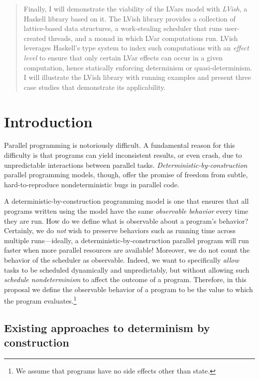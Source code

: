 \documentclass{article}
\begin{document}
\begin{abstract}
  Finally, I will demonstrate the viability of the LVars model with
  \emph{LVish}, a Haskell library based on it.  The LVish library
  provides a collection of lattice-based data structures, a
  work-stealing scheduler that runs user-created threads, and a monad
  in which LVar computations run.  LVish leverages Haskell's type
  system to index such computations with an \emph{effect level} to
  ensure that only certain LVar effects can occur in a given
  computation, hence statically enforcing determinism or
  quasi-determinism.  I will illustrate the LVish library with running
  examples and present three case studies that demonstrate its
  applicability.
\end{abstract}

\section{Introduction}\label{s:intro}

Parallel programming is notoriously difficult.  
A fundamental reason for this difficulty is that programs can yield
inconsistent results, or even crash, due to unpredictable interactions
between parallel tasks.  \emph{Deterministic-by-construction} parallel
programming models, though, offer the promise of freedom from subtle,
hard-to-reproduce nondeterministic bugs in parallel code.

A deterministic-by-construction programming model is one that ensures
that all programs written using the model have the same
\emph{observable behavior} every time they are run.  How do we define
what is observable about a program's behavior?  Certainly, we do
\emph{not} wish to preserve behaviors such as running time across
multiple runs---ideally, a deterministic-by-construction parallel
program will run faster when more parallel resources are available!
Moreover, we do not count the behavior of the scheduler as observable.
Indeed, we want to specifically \emph{allow} tasks to be scheduled
dynamically and unpredictably, but without allowing such
\emph{schedule nondeterminism} to affect the outcome of a program.
Therefore, in this proposal we define the observable behavior of a
program to be the value to which the program evaluates.\footnote{We
  assume that programs have no side effects other than state.}

\subsection{Existing approaches to determinism by construction}
\end{document}
